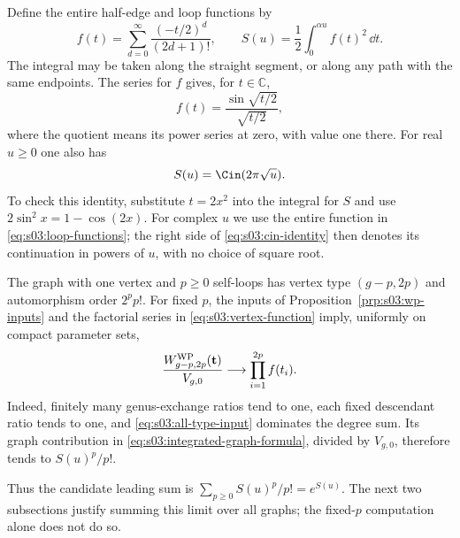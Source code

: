 Define the entire half-edge and loop functions by
\begin{equation}
\label{eq:s03:loop-functions}
f(t)=\sum_{d=0}^{\infty}\frac{(-t/2)^d}{(2d+1)!},
\qquad
S(u)=\frac12\int_0^{\alpha u}f(t)^2\,\dd t.
\end{equation}
The integral may be taken along the straight segment, or along any path
with the same endpoints. The series for $f$ gives, for $t\in\mathbb C$,
\begin{equation}
\label{eq:s03:sine-function}
f(t)=\frac{\sin\sqrt{t/2}}{\sqrt{t/2}},
\end{equation}
where the quotient means its power series at zero, with value one there.
For real $u\geq0$ one also has
\begin{equation}
\label{eq:s03:cin-identity}
S(u)=\Cin(2\pi\sqrt u).
\end{equation}
To check this identity, substitute $t=2x^2$ into the
integral for $S$ and use $2\sin^2x=1-\cos(2x)$. For complex $u$ we use
the entire function in \eqref{eq:s03:loop-functions}; the right side of
\eqref{eq:s03:cin-identity} then denotes its continuation in powers of
$u$, with no choice of square root.

\begin{exm}
The graph with one vertex and $p\geq0$ self-loops has vertex type
$(g-p,2p)$ and automorphism order $2^p p!$. For fixed $p$, the inputs
of Proposition~\ref{prp:s03:wp-inputs} and the factorial series in
\eqref{eq:s03:vertex-function} imply, uniformly on compact parameter
sets,
\[
\frac{W^{\rm WP}_{g-p,2p}(\mathbf t)}{V_{g,0}}
\longrightarrow\prod_{i=1}^{2p}f(t_i).
\]
Indeed, finitely many genus-exchange ratios tend to one, each fixed
descendant ratio tends to one, and
\eqref{eq:s03:all-type-input} dominates the degree sum.
Its graph contribution in \eqref{eq:s03:integrated-graph-formula},
divided by $V_{g,0}$, therefore tends to $S(u)^p/p!$.

Thus the candidate leading sum is $\sum_{p\geq0}S(u)^p/p!=e^{S(u)}$.
The next two subsections justify summing this limit over all graphs;
the fixed-$p$ computation alone does not do so.
\end{exm}
